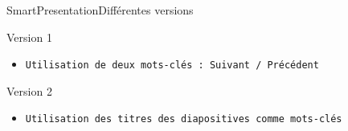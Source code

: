 \documentclass[10pt]{beamer}
\begin{document}
\begin{frame}{SmartPresentation}{Différentes versions}
	\begin{block}{Version 1}
	  	\begin{itemize}
	  		\item {\tt Utilisation de deux mots-clés : Suivant / Précédent} 		
		\end{itemize}
	\end{block}

	\begin{block}{Version 2}
	  	\begin{itemize}  
	  		\item {\tt Utilisation des titres des diapositives comme mots-clés}   		
		\end{itemize}
	\end{block}


\end{frame}
\end{document}
